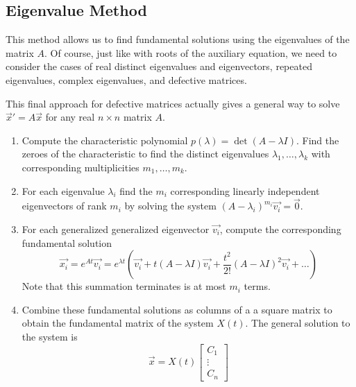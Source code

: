 \subsection{Eigenvalue Method}
\noindent
This method allows us to find fundamental solutions using the eigenvalues of the matrix $A$.
Of course, just like with roots of the auxiliary equation, we need to consider the cases of real distinct eigenvalues and eigenvectors, repeated eigenvalues, complex eigenvalues, and defective matrices. 






\noindent
This final approach for defective matrices actually gives a general way to solve $\vec{x}' = A\vec{x}$ for any real $n \times n$ matrix $A$.
\begin{enumerate}[label = \arabic*)]
	\item
		Compute the characteristic polynomial $p(\lambda) = \det{(A - \lambda I)}$. Find the zeroes of the characteristic to find the distinct eigenvalues $\lambda_1, \ldots, \lambda_k$ with corresponding multiplicities $m_1, \ldots, m_k$.
	\item
		For each eigenvalue $\lambda_i$ find the $m_i$ corresponding linearly independent eigenvectors of rank $m_i$ by solving the system $(A - \lambda_i)^{m_i}\vec{v_i} = \vec{0}$.
	\item
		For each generalized generalized eigenvector $\vec{v_i}$, compute the corresponding fundamental solution
		\begin{equation*}
			\vec{x_i} = e^{At}\vec{v_i} = e^{\lambda t}\left(\vec{v_i} + t(A - \lambda I)\vec{v_i} + \frac{t^2}{2!}(A - \lambda I)^2\vec{v_i} + \ldots\right)
		\end{equation*}
		Note that this summation terminates is at most $m_i$ terms.
	\item
		Combine these fundamental solutions as columns of a a square matrix to obtain the fundamental matrix of the system $X(t)$. The general solution to the system is
		\begin{equation*}
			\vec{x} = X(t)\begin{bmatrix}
				C_1 \\
				\vdots \\
				C_n
			\end{bmatrix}
		\end{equation*}
\end{enumerate}